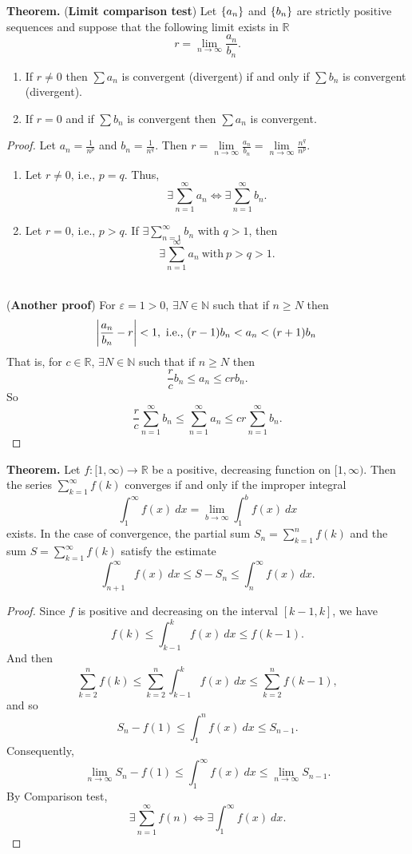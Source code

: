 \documentclass[12pt,a4paper]{article}
\newcommand{\dispsty}{\displaystyle}
\begin{document}
\begin{tcolorbox}[colback=white]
	\textbf{Theorem.} (\textbf{Limit comparison test}) Let $\set{a_n}$ and $\set{b_n}$ are strictly positive sequences and suppose that the following limit exists in $\mathbb{R}$ \[
	r=\lim\limits_{n\to\infty}\frac{a_n}{b_n}.
	\]\begin{enumerate}
		\item If $r\neq 0$ then $\sum a_n$ is convergent (divergent) if and only if $\sum b_n$ is convergent (divergent).
		\item If $r=0$ and if $\sum b_n$ is convergent then $\sum a_n$ is convergent.
	\end{enumerate}\tcblower\begin{proof}
	Let $\dispsty a_n=\frac{1}{n^p}$ and $\dispsty b_n=\frac{1}{n^q}$. Then $\dispsty
	r=\lim\limits_{n\to\infty}\frac{a_n}{b_n}=\lim\limits_{n\to\infty}\frac{n^q}{n^p}$. \begin{enumerate}
		\item Let $r\neq 0$, i.e., $p=q$. Thus, \[
		\exists\sum_{n=1}^\infty a_n\iff\exists\sum_{n=1}^\infty b_n.
		\]
		\item Let $r=0$, i.e., $p>q$. If $\exists\sum_{n=1}^\infty b_n$ with $q>1$, then \[
		\exists\sum_{n=1}^\infty a_n\ \text{with}\ p>q>1.
		\]
	\end{enumerate}\
\\ (\textbf{Another proof}) For $\varepsilon=1>0$, $\exists N\in\mathbb{N}$ such that if $n\geq N$ then \[
\abs{\frac{a_n}{b_n}-r}<1,\ \text{i.e.,}\ (r-1)b_n<a_n<(r+1)b_n
\]That is, for $c\in\mathbb{R}$, $\exists N\in\mathbb{N}$ such that if $n\geq N$ then \[
	\frac{r}{c}b_n\leq a_n\leq crb_n.
	\] So \[
	\frac{r}{c}\sum_{n=1}^\infty b_n\leq \sum_{n=1}^\infty a_n\leq cr\sum_{n=1}^\infty b_n.
	\]
\end{proof}
\end{tcolorbox}

\begin{tcolorbox}[colback=white]
	\textbf{Theorem.} Let $f:[1,\infty)\to\mathbb{R}$ be a positive, decreasing function on $[1,\infty)$. Then the series $\sum_{k=1}^\infty f(k)$ converges if and only if the improper integral \[
	\int_{1}^\infty f(x)\ dx = \lim\limits_{b\to\infty}\int_{1}^bf(x)\ dx
	\] exists. In the case of convergence, the partial sum $S_n=\sum_{k=1}^nf(k)$ and the sum $S=\sum_{k=1}^\infty f(k)$ satisfy the estimate \[
	\int_{n+1}^\infty f(x)\ dx\leq S-S_n\leq\int_{n}^\infty f(x)\ dx.
	\]\tcblower\begin{proof}
		Since $f$ is positive and decreasing on the interval $[k-1,k]$, we have \[
		f(k)\leq\int_{k-1}^k f(x)\ dx\leq f(k-1).
		\] And then \[
		\sum_{k=2}^nf(k)\leq\sum_{k=2}^n\int_{k-1}^k f(x)\ dx\leq\sum_{k=2}^nf(k-1),
		\] and so \[
		S_n-f(1)\leq\int_{1}^nf(x)\ dx\leq S_{n-1}.
		\] Consequently, \[
		\lim\limits_{n\to\infty}S_n-f(1)\leq\int_{1}^\infty f(x)\ dx\leq \lim\limits_{n\to\infty}S_{n-1}.
		\] By Comparison test, \[
		\exists\sum_{n=1}^\infty f(n)\iff\exists\int_{1}^\infty f(x)\ dx.
		\]
	\end{proof}
\end{tcolorbox}
\end{document}
